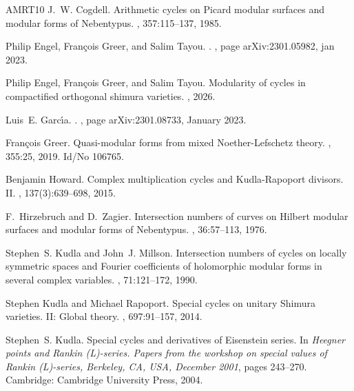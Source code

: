 \documentclass[11pt,letterpaper,english]{amsart}
\numberwithin{equation}{subsection}
\numberwithin{equation}{section}
\theoremstyle{plain}
\theoremstyle{remark}
\begin{document}
\begin{thebibliography}{AMRT10}
J.~W. Cogdell.
\newblock Arithmetic cycles on {Picard} modular surfaces and modular forms of
  {Nebentypus}.
, 357:115--137, 1985.

Philip {Engel}, Fran{\c{c}}ois {Greer}, and Salim {Tayou}.
.
, page arXiv:2301.05982, jan 2023.

Philip Engel, Fran\c{c}ois Greer, and Salim Tayou.
\newblock Modularity of cycles in compactified orthogonal shimura varieties.
, 2026.

Luis~E. {Garc{\'\i}a}.
.
, page arXiv:2301.08733, January 2023.

Fran{\c{c}}ois Greer.
\newblock Quasi-modular forms from mixed {Noether}-{Lefschetz} theory.
, 355:25, 2019.
\newblock Id/No 106765.

Benjamin Howard.
\newblock Complex multiplication cycles and {Kudla}-{Rapoport} divisors. {II}.
, 137(3):639--698, 2015.

F.~Hirzebruch and D.~Zagier.
\newblock Intersection numbers of curves on {H}ilbert modular surfaces and
  modular forms of {N}ebentypus.
, 36:57--113, 1976.

Stephen~S. Kudla and John~J. Millson.
\newblock Intersection numbers of cycles on locally symmetric spaces and
  {Fourier} coefficients of holomorphic modular forms in several complex
  variables.
, 71:121--172, 1990.

Stephen Kudla and Michael Rapoport.
\newblock Special cycles on unitary {Shimura} varieties. {II}: {Global} theory.
, 697:91--157, 2014.

Stephen~S. Kudla.
\newblock Special cycles and derivatives of {E}isenstein series.
\newblock In {\em Heegner points and Rankin (L)-series. Papers from the
  workshop on special values of Rankin (L)-series, Berkeley, {CA}, {USA},
  December 2001}, pages 243--270. Cambridge: Cambridge University Press, 2004.


\end{thebibliography}
\end{document}

